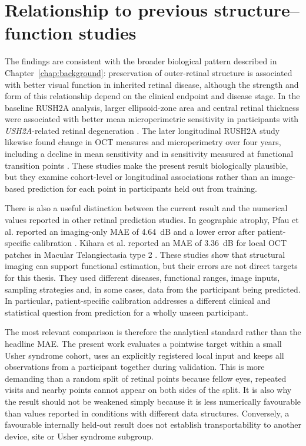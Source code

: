 \section{Relationship to previous structure--function studies}

The findings are consistent with the broader biological pattern described in Chapter~\ref{chap:background}: preservation of outer-retinal structure is associated with better visual function in inherited retinal disease, although the strength and form of this relationship depend on the clinical endpoint and disease stage. In the baseline RUSH2A analysis, larger ellipsoid-zone area and central retinal thickness were associated with better mean microperimetric sensitivity in participants with \textit{USH2A}-related retinal degeneration \citep{Lad2022}. The later longitudinal RUSH2A study likewise found change in OCT measures and microperimetry over four years, including a decline in mean sensitivity and in sensitivity measured at functional transition points \citep{Vincent2025}. These studies make the present result biologically plausible, but they examine cohort-level or longitudinal associations rather than an image-based prediction for each point in participants held out from training.

There is also a useful distinction between the current result and the numerical values reported in other retinal prediction studies. In geographic atrophy, Pfau et al. reported an imaging-only MAE of 4.64~dB and a lower error after patient-specific calibration \citep{Pfau2020}. Kihara et al. reported an MAE of 3.36~dB for local OCT patches in Macular Telangiectasia type 2 \citep{Kihara2019}. These studies show that structural imaging can support functional estimation, but their errors are not direct targets for this thesis. They used different diseases, functional ranges, image inputs, sampling strategies and, in some cases, data from the participant being predicted. In particular, patient-specific calibration addresses a different clinical and statistical question from prediction for a wholly unseen participant.

The most relevant comparison is therefore the analytical standard rather than the headline MAE. The present work evaluates a pointwise target within a small Usher syndrome cohort, uses an explicitly registered local input and keeps all observations from a participant together during validation. This is more demanding than a random split of retinal points because fellow eyes, repeated visits and nearby points cannot appear on both sides of the split. It is also why the result should not be weakened simply because it is less numerically favourable than values reported in conditions with different data structures. Conversely, a favourable internally held-out result does not establish transportability to another device, site or Usher syndrome subgroup.

